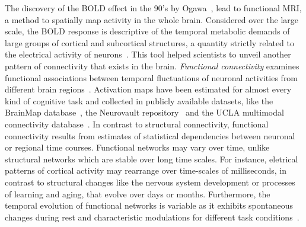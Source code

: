 The discovery of the BOLD effect in the 90's by Ogawa~\cite{ogawa1990}, lead to functional MRI, a method to spatially map activity in the whole brain.
Considered over the large scale, the BOLD response is descriptive of the temporal metabolic demands of large groups of cortical and subcortical structures, a quantity strictly related to the electrical activity of neurons~\cite{logothetis2001}.
This tool helped scientists to unveil another pattern of connectivity that exists in the brain. \emph{Functional connectivity} examines functional associations between temporal fluctuations of neuronal activities from different brain regions~\cite{biswal1995}.
Activation maps have been estimated for almost every kind of cognitive task and collected in publicly available datasets, like the BrainMap database~\cite{fox2002}, the Neurovault repository~\cite{gorgolewski2015} and the UCLA multimodal connectivity database~\cite{brown2012}.
In contrast to structural connectivity, functional connectivity results from estimates of statistical dependencies between neuronal or regional time courses.
Functional networks may vary over time, unlike structural networks which are stable over long time scales. For instance, eletrical patterns of cortical activity may rearrange over time-scales of milliseconds, in contrast to structural changes like the nervous system development or processes of learning and aging, that evolve over days or months.
Furthermore, the temporal evolution of functional networks is variable as it exhibits spontaneous changes during rest and characteristic modulations for different task conditions~\cite{honey2007,hutchison2013}.


